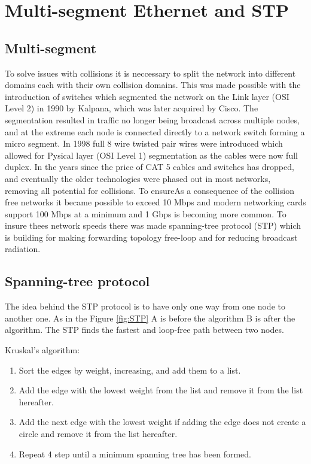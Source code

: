 \section{Multi-segment Ethernet and STP}
\subsection{Multi-segment}

To solve issues with collisions it is neccessary to split the network into different domains each with their own collision domains. This was made possible with the introduction of switches which segmented the network on the Link layer (OSI Level 2) in 1990 by Kalpana, which was later acquired by Cisco. The segmentation resulted in traffic no longer being broadcast across multiple nodes, and at the extreme each node is connected directly to a network switch forming a micro segment. In 1998 full 8 wire twisted pair wires were introduced which allowed for Pysical layer (OSI Level 1) segmentation as the cables were now full duplex. In the years since the price of CAT 5 cables and switches has dropped, and eventually the older technologies were phased out in most networks, removing all potential for collisions. To ensureAs a consequence of the collision free networks it became possible to exceed 10 Mbps and modern networking cards support 100 Mbps at a minimum and 1 Gbps is becoming more common. To insure thees network speeds there was made spanning-tree protocol (STP) which is building for making forwarding topology free-loop and for reducing broadcast radiation. 

\subsection{Spanning-tree protocol}
The idea behind the STP protocol is to have only one way from one node to another one. As in the Figure \ref{fig:STP} A is before the algorithm B is after the algorithm. The STP finds the fastest and loop-free path between two nodes.

Kruskal's algorithm:

\begin{enumerate}
	\item Sort the edges by weight, increasing, and add them to a list.
	\item Add the edge with the lowest weight from the list and remove it from the list hereafter.	
	\item Add the next edge with the lowest weight if adding the edge does not create a circle and remove it from the list hereafter.
	\item Repeat 4 step until a minimum spanning tree has been formed.
\end{enumerate}

